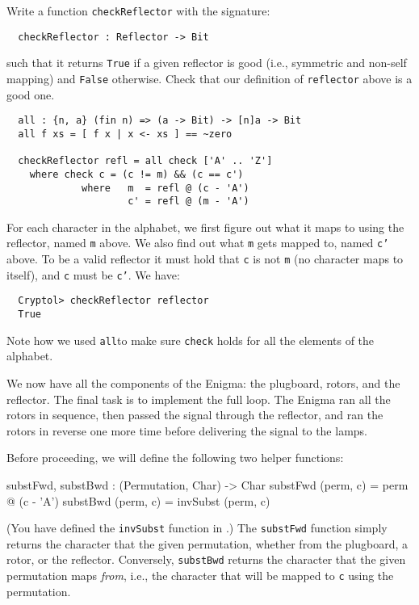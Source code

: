 \begin{Exercise}\label{ex:enigma:6}
Write a function {\tt checkReflector} with the signature:
\begin{Verbatim}
  checkReflector : Reflector -> Bit
\end{Verbatim}
such that it returns {\tt True} if a given reflector is good (i.e.,
symmetric and non-self mapping) and {\tt False} otherwise. Check that
our definition of {\tt reflector} above is a good one. 
\end{Exercise}
\begin{Answer}
\begin{Verbatim}
  all : {n, a} (fin n) => (a -> Bit) -> [n]a -> Bit
  all f xs = [ f x | x <- xs ] == ~zero

  checkReflector refl = all check ['A' .. 'Z']
    where check c = (c != m) && (c == c')
             where   m  = refl @ (c - 'A')
                     c' = refl @ (m - 'A')
\end{Verbatim}
For each character in the alphabet, we first figure out what it maps
to using the reflector, named {\tt m} above. We also find out what
{\tt m} gets mapped to, named {\tt c'} above. To be a valid reflector
it must hold that {\tt c} is not {\tt m} (no character maps to
itself), and {\tt c} must be {\tt c'}. We have:
\begin{Verbatim}
  Cryptol> checkReflector reflector
  True
\end{Verbatim}
Note how we used {\tt all}\indAll to make sure {\tt check} holds for
all the elements of the alphabet.
\end{Answer}


We now have all the components of the Enigma: the plugboard, rotors,
and the reflector.  The final task is to implement the full loop. The
Enigma ran all the rotors in sequence, then passed the signal through
the reflector, and ran the rotors in reverse one more time before
delivering the signal to the lamps.

Before proceeding, we will define the following two helper functions:
\begin{code}
  substFwd, substBwd : (Permutation, Char) -> Char
  substFwd (perm, c) = perm @ (c - 'A')
  substBwd (perm, c) = invSubst (perm, c)
\end{code}
(You have defined the {\tt invSubst} function in
.) The {\tt substFwd}
function simply returns the character that the given permutation,
whether from the plugboard, a rotor, or the reflector. Conversely,
{\tt substBwd} returns the character that the given permutation maps
{\em from}, i.e., the character that will be mapped to {\tt c} using
the permutation.

